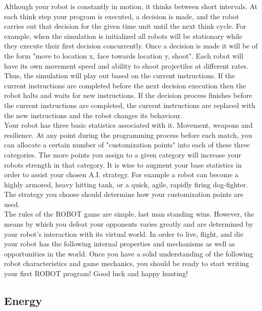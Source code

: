 \documentclass[a4paper]{article}
\begin{document}
Although your robot is constantly in motion, it thinks between short intervals. At each think step your program is executed, a decision is made, and the robot carries out that decision for the given time unit until the next think cycle. For example, when the simulation is initialized all robots will be stationary while they execute their first decision concurrently. Once a decision is made it will be of the form "move to location x, face towards location y, shoot". Each robot will have its own movement speed and ability to shoot projectiles at different rates. Thus, the simulation will play out based on the current instructions. If the current instructions are completed before the next decision execution then the robot halts and waits for new instructions. If the decision process finishes before the current instructions are completed, the current instructions are replaced with the new instructions and the robot changes its behaviour.\\

Your robot has three basic statistics associated with it. Movement, weapons and resilience. At any point during the programming process before each match, you can allocate a certain number of "customization points" into each of these three categories. The more points you assign to a given category will increase your robots strength in that category. It is wise to augment your base statistics in order to assist your chosen A.I. strategy. For example a robot can become a highly armored, heavy hitting tank, or a quick, agile, rapidly firing dog-fighter. The strategy you choose should determine how your customization points are used.\\

The rules of the ROBOT game are simple, last man standing wins. However, the means by which you defeat your opponents varies greatly and are determined by your robot's interaction with its virtual world. In order to live, flight, and die your robot has the following internal properties and mechanisms as well as opportunities in the world. Once you have a solid understanding of the following robot characteristics and game mechanics, you should be ready to start writing your first ROBOT program! Good luck and happy hunting!\\

\subsection{Energy}
\end{document}
